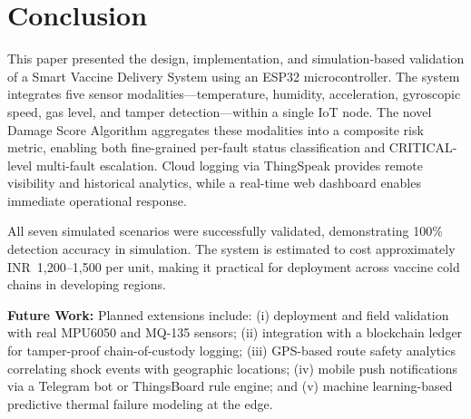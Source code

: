 \documentclass[12pt, a4paper]{article}
\begin{document}
\section{Conclusion}
\label{sec:conclusion}

This paper presented the design, implementation, and simulation-based validation of a Smart Vaccine Delivery System using an ESP32 microcontroller. The system integrates five sensor modalities—temperature, humidity, acceleration, gyroscopic speed, gas level, and tamper detection—within a single IoT node. The novel Damage Score Algorithm aggregates these modalities into a composite risk metric, enabling both fine-grained per-fault status classification and CRITICAL-level multi-fault escalation. Cloud logging via ThingSpeak provides remote visibility and historical analytics, while a real-time web dashboard enables immediate operational response.

All seven simulated scenarios were successfully validated, demonstrating 100\% detection accuracy in simulation. The system is estimated to cost approximately INR~1,200--1,500 per unit, making it practical for deployment across vaccine cold chains in developing regions.

\smallskip
\noindent\textbf{Future Work:} Planned extensions include: (i) deployment and field validation with real MPU6050 and MQ-135 sensors; (ii) integration with a blockchain ledger for tamper-proof chain-of-custody logging; (iii) GPS-based route safety analytics correlating shock events with geographic locations; (iv) mobile push notifications via a Telegram bot or ThingsBoard rule engine; and (v) machine learning-based predictive thermal failure modeling at the edge.
\end{document}
